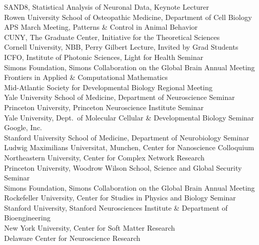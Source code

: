 \documentclass[11pt]{article}
\begin{document}
SAND8, Statistical Analysis of Neuronal Data, Keynote Lecturer \\
Rowen University School of Osteopathic Medicine, Department of Cell Biology \\
APS March Meeting, Patterns \& Control in Animal Behavior \\
CUNY, The Graduate Center, Initiative for the Theoretical Sciences\\
Cornell University, NBB, Perry Gilbert Lecture, Invited by Grad Students\\
ICFO, Institute of Photonic Sciences, Light for Health Seminar  \\
Simons Foundation, Simons Collaboration on the Global Brain Annual Meeting  \\ 
Frontiers in Applied \& Computational Mathematics\\
Mid-Atlantic Society for Developmental Biology Regional Meeting \\
Yale University School of Medicine, Department of Neuroscience Seminar \\
Princeton University, Princeton Neuroscience Institute Seminar \\
Yale University, Dept.~of Molecular Cellular \& Developmental Biology Seminar \\
Google, Inc. \\
Stanford University School of Medicine, Department of Neurobiology Seminar \\
Ludwig Maximilians Universitat, Munchen, Center for Nanoscience Colloquium \\
Northeastern University, Center for Complex Network Research  \\ 
Princeton University, Woodrow Wilson School, Science and Global Security Seminar \\
Simons Foundation, Simons Collaboration on the Global Brain Annual Meeting \\
Rockefeller University, Center for Studies in Physics and Biology Seminar \\
 Stanford University, Stanford Neurosciences Institute \& Department of Bioengineering \\
 New York University, Center for Soft Matter Research \\
 Delaware Center for Neuroscience Research  \\
\end{document}
